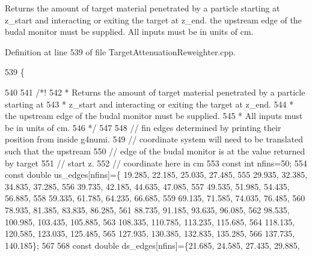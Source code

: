 Returns the amount of target material penetrated by a particle starting at z\-\_\-start and interacting or exiting the target at z\-\_\-end. the upstream edge of the budal monitor must be supplied. All inputs must be in units of cm.

Definition at line 539 of file Target\-Attenuation\-Reweighter.\-cpp.


\begin{DoxyCode}
539                                                                                                          \{ 
       
540 \textcolor{comment}{}
541 \textcolor{comment}{        /*!}
542 \textcolor{comment}{     * Returns the amount of target material penetrated by a particle starting at}
543 \textcolor{comment}{     * z\_start and interacting or exiting the target at z\_end.}
544 \textcolor{comment}{     * the upstream edge of the budal monitor must be supplied.}
545 \textcolor{comment}{     * All inputs must be in units of cm.}
546 \textcolor{comment}{     */}
547 
548     \textcolor{comment}{// fin edges determined by printing their position from inside g4numi. }
549     \textcolor{comment}{// coordinate system will need to be translated such that the upstream}
550     \textcolor{comment}{// edge of the budal monitor is at the value returned by target}
551     \textcolor{comment}{// start z.}
552     \textcolor{comment}{// coordinate here in cm}
553     \textcolor{keyword}{const} \textcolor{keywordtype}{int} nfins=50;
554     \textcolor{keyword}{const} \textcolor{keywordtype}{double} us\_edges[nfins]=\{ 19.285, 22.185, 25.035, 27.485, 
555                                    29.935, 32.385, 34.835, 37.285, 
556                                    39.735, 42.185, 44.635, 47.085,
557                                    49.535, 51.985, 54.435, 56.885,
558                                    59.335, 61.785, 64.235, 66.685,
559                                    69.135, 71.585, 74.035, 76.485,
560                                    78.935, 81.385, 83.835, 86.285,
561                                    88.735, 91.185, 93.635, 96.085,
562                                    98.535, 100.985, 103.435, 105.885,
563                                    108.335, 110.785, 113.235, 115.685,
564                                    118.135, 120.585, 123.035, 125.485,
565                                    127.935, 130.385, 132.835, 135.285,
566                                    137.735, 140.185\};
567     
568     \textcolor{keyword}{const} \textcolor{keywordtype}{double} ds\_edges[nfins]=\{21.685, 24.585, 27.435, 29.885,

\end{DoxyCode}
